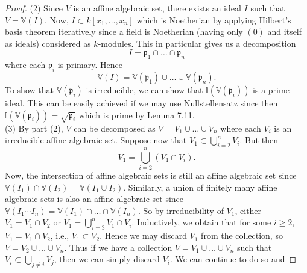 \documentclass[reqno]{amsart}
\theoremstyle{definition}
\theoremstyle{remark}
\begin{document}
\begin{proof}
        (2) Since $V$ is an affine algebraic set,
        there exists an ideal $I$ such that
        $V = \mathbb{V}(I)$. Now,
        $I \subset k\left[ x_1, \ldots, x_n \right] $ which
        is Noetherian by applying
        Hilbert's basis theorem
        iteratively since a field is Noetherian (having
        only $\left( 0 \right) $ and itself as ideals) considered
        as $k$-modules. This in particular
        gives us a decomposition
        \[
        I = \mathfrak{p}_1 \cap \ldots \cap
        \mathfrak{p}_n
        \]
        where each $\mathfrak{p}_i$ is primary. Hence
        \[
        \mathbb{V}(I)
        = \mathbb{V}(\mathfrak{p}_1) \cup
        \ldots \cup
        \mathbb{V}\left( \mathfrak{p}_n \right) .
        \]
        To show that
        $\mathbb{V}\left( \mathfrak{p}_i \right) $
        is irreducible, we can
        show that
        $\mathbb{I} \left( \mathbb{V}
        \left( \mathfrak{p}_i \right) \right) $ is a
        prime ideal.
        This can be easily achieved if we may use
        Nullstellensatz since then
        $\mathbb{I} \left( \mathbb{V}\left(
        \mathfrak{p}_i\right)  \right)
        = \sqrt{\mathfrak{p}_i}
        $ which is prime by Lemma 7.11.\\
        \linebreak
        (3) By part (2),
        $V$ can be decomposed as
        $V = V_1 \cup \ldots \cup  V_n$ where
        each $V_i$ is an irreducible affine
        algebraic set. Suppose now that
        $V_1 \subset \bigcup_{i=2}^{n}V_i $.
        But then
        \[
        V_1 = \bigcup_{i=2}^{n} \left( V_1 \cap
        V_i \right).
        \]
        Now, the intersection of affine algebraic sets
        is still an affine algebraic set since
        $\mathbb{V}(I_1) \cap
        \mathbb{V}(I_2) =
        \mathbb{V}\left( I_1 \cup I_2 \right) $.
       Similarly, a union of finitely many affine
       algebraic sets is also an affine algebraic set since
       $\mathbb{V}(I_1 \cdots I_n)
       = \mathbb{V}(I_1) \cap \ldots \cap
       \mathbb{V}(I_n)$.
       So by irreducibility of $V_1$, either
       $V_1 = V_1 \cap V_2$ or
       $V_1 = \bigcup_{i=3}^{n} V_1 \cap V_i$.
       Inductively, we obtain that for some
       $i\ge 2$,
       $V_1 = V_1 \cap V_2$, i.e.,
       $V_1 \subset  V_2$. Hence we may
       discard $ V_1$ from the collection, so
       $V = V_2 \cup  \ldots \cup  V_n$.
       Thus if we have a collection
       $V = V_1 \cup \ldots \cup  V_n$ such that
       $V_i \subset \bigcup_{j\neq i} V_j$, then we
       can simply discard $V_i$. We can continue to do so and

\end{proof}
\end{document}
